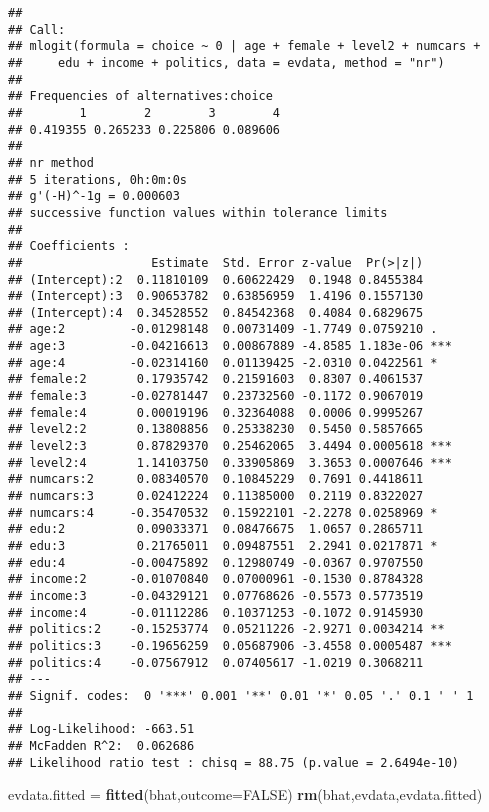 \documentclass[
]{article}
\newenvironment{Shaded}{\begin{snugshade}}{\end{snugshade}}
\newcommand{\DataTypeTok}[1]{\textcolor[rgb]{0.13,0.29,0.53}{#1}}
\newcommand{\KeywordTok}[1]{\textcolor[rgb]{0.13,0.29,0.53}{\textbf{#1}}}
\newcommand{\NormalTok}[1]{#1}
\newcommand{\OtherTok}[1]{\textcolor[rgb]{0.56,0.35,0.01}{#1}}
\newcommand{\StringTok}[1]{\textcolor[rgb]{0.31,0.60,0.02}{#1}}
\begin{document}
\begin{verbatim}
## 
## Call:
## mlogit(formula = choice ~ 0 | age + female + level2 + numcars + 
##     edu + income + politics, data = evdata, method = "nr")
## 
## Frequencies of alternatives:choice
##        1        2        3        4 
## 0.419355 0.265233 0.225806 0.089606 
## 
## nr method
## 5 iterations, 0h:0m:0s 
## g'(-H)^-1g = 0.000603 
## successive function values within tolerance limits 
## 
## Coefficients :
##                  Estimate  Std. Error z-value  Pr(>|z|)    
## (Intercept):2  0.11810109  0.60622429  0.1948 0.8455384    
## (Intercept):3  0.90653782  0.63856959  1.4196 0.1557130    
## (Intercept):4  0.34528552  0.84542368  0.4084 0.6829675    
## age:2         -0.01298148  0.00731409 -1.7749 0.0759210 .  
## age:3         -0.04216613  0.00867889 -4.8585 1.183e-06 ***
## age:4         -0.02314160  0.01139425 -2.0310 0.0422561 *  
## female:2       0.17935742  0.21591603  0.8307 0.4061537    
## female:3      -0.02781447  0.23732560 -0.1172 0.9067019    
## female:4       0.00019196  0.32364088  0.0006 0.9995267    
## level2:2       0.13808856  0.25338230  0.5450 0.5857665    
## level2:3       0.87829370  0.25462065  3.4494 0.0005618 ***
## level2:4       1.14103750  0.33905869  3.3653 0.0007646 ***
## numcars:2      0.08340570  0.10845229  0.7691 0.4418611    
## numcars:3      0.02412224  0.11385000  0.2119 0.8322027    
## numcars:4     -0.35470532  0.15922101 -2.2278 0.0258969 *  
## edu:2          0.09033371  0.08476675  1.0657 0.2865711    
## edu:3          0.21765011  0.09487551  2.2941 0.0217871 *  
## edu:4         -0.00475892  0.12980749 -0.0367 0.9707550    
## income:2      -0.01070840  0.07000961 -0.1530 0.8784328    
## income:3      -0.04329121  0.07768626 -0.5573 0.5773519    
## income:4      -0.01112286  0.10371253 -0.1072 0.9145930    
## politics:2    -0.15253774  0.05211226 -2.9271 0.0034214 ** 
## politics:3    -0.19656259  0.05687906 -3.4558 0.0005487 ***
## politics:4    -0.07567912  0.07405617 -1.0219 0.3068211    
## ---
## Signif. codes:  0 '***' 0.001 '**' 0.01 '*' 0.05 '.' 0.1 ' ' 1
## 
## Log-Likelihood: -663.51
## McFadden R^2:  0.062686 
## Likelihood ratio test : chisq = 88.75 (p.value = 2.6494e-10)
\end{verbatim}

\begin{Shaded}
\begin{Highlighting}[]
\NormalTok{evdata.fitted =}\StringTok{ }\KeywordTok{fitted}\NormalTok{(bhat,}\DataTypeTok{outcome=}\OtherTok{FALSE}\NormalTok{)}
\KeywordTok{rm}\NormalTok{(bhat,evdata,evdata.fitted)}
\end{Highlighting}
\end{Shaded}
\end{document}
